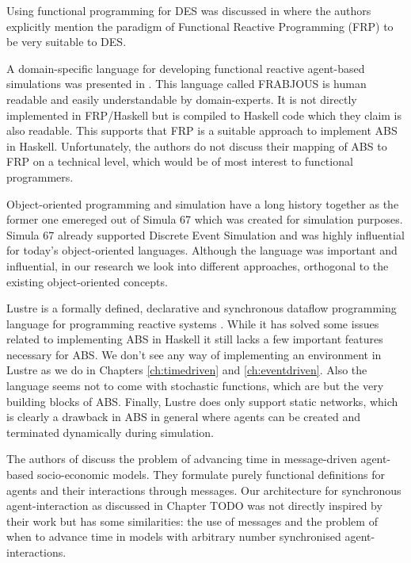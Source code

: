 Using functional programming for DES was discussed in \cite{jankovic_functional_2007} where the authors explicitly mention the paradigm of Functional Reactive Programming (FRP) to be very suitable to DES.

A domain-specific language for developing functional reactive agent-based simulations was presented in \cite{schneider_towards_2012,vendrov_frabjous_2014}. This language called FRABJOUS is human readable and easily understandable by domain-experts. It is not directly implemented in FRP/Haskell but is compiled to Haskell code which they claim is also readable. This supports that FRP is a suitable approach to implement ABS in Haskell. Unfortunately, the authors do not discuss their mapping of ABS to FRP on a technical level, which would be of most interest to functional programmers.

Object-oriented programming and simulation have a long history together as the former one emereged out of Simula 67 \cite{dahl_birth_2002} which was created for simulation purposes. Simula 67 already supported Discrete Event Simulation and was highly influential for today's object-oriented languages. Although the language was important and influential, in our research we look into different approaches, orthogonal to the existing object-oriented concepts.

Lustre is a formally defined, declarative and synchronous dataflow programming language for programming reactive systems \cite{halbwachs_synchronous_1991}. While it has solved some issues related to implementing ABS in Haskell it still lacks a few important features necessary for ABS. We don't see any way of implementing an environment in Lustre as we do in Chapters  \ref{ch:timedriven} and \ref{ch:eventdriven}. Also the language seems not to come with stochastic functions, which are but the very building blocks of ABS. Finally, Lustre does only support static networks, which is clearly a drawback in ABS in general where agents can be created and terminated dynamically during simulation.

The authors of \cite{botta_time_2010} discuss the problem of advancing time in message-driven agent-based socio-economic models. They formulate purely functional definitions for agents and their interactions through messages. Our architecture for synchronous agent-interaction as discussed in Chapter TODO was not directly inspired by their work but has some similarities: the use of messages and the problem of when to advance time in models with arbitrary number synchronised agent-interactions.


